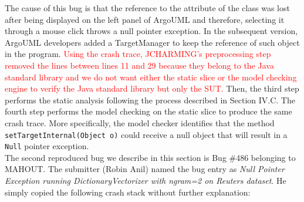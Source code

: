 \documentclass[times, doublespace]{smrauth}
\newcommand{\red}[1]{\textcolor{red}{#1}}
\begin{document}
{The cause of this bug is that the reference to the attribute of
the class was lost after being displayed on the left panel of
ArgoUML and therefore, selecting it through a mouse click
throws a null pointer exception. In the subsequent version,
ArgoUML developers added a TargetManager to keep the
reference of such object in the program. \red{Using the crash trace, JCHARMING's preprocessing step
removed the lines between lines 11 and 29 because they
belong to the Java standard library and we do not want either
the static slice or the model checking engine to verify the
Java standard library but only the SUT.} Then, the third step
performs the static analysis following the process described in
Section IV.C. The fourth step performs the model checking on
the static slice to produce the same crash trace. More
specifically, the model checker identifies that the method
{\tt setTargetInternal(Object o)} could receive a null object that
will result in a {\tt Null} pointer exception. \\

The second reproduced bug we describe in this section is Bug \#486 belonging to MAHOUT. The submitter (Robin Anil) named the bug entry as {\it Null Pointer Exception running DictionaryVectorizer with ngram=2 on Reuters dataset}. He simply copied the following crash stack without further explanation:

\vspace*{0.3cm}

}
\end{document}

